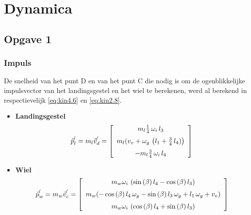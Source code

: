 \section{Dynamica}
\subsection{Opgave 1}
\subsubsection{Impuls}
De snelheid van het punt D en van het punt C die nodig is om de ogenblikkelijke impulsvector van het landingsgestel en het wiel te berekenen, werd al berekend in respectievelijk \eqref{eq:kin4.6} en \eqref{eq:kin2.8}.
\begin{itemize}
\item \textbf{Landingsgestel} 
\begin{equation}
\vec{p}_{l}^{'}=m_{l}\vec{v}_{d}^{'}=
\left[ \begin {array}{c} m_{l}\frac{1}{4}\,\omega_{i}\,l_{3}\\ \noalign{\medskip}m_{l}(v_{v}+\omega_{g}\, \left( l_{1}+\frac{3}{4}\,l_{4}) \right) \\ \noalign{\medskip}-m_{l}\frac{3}{4}\,\omega_{i}\,l_{4}\end {array} \right]
\label{eq:dyn1.1}
\end{equation}
\item \textbf{Wiel}
\begin{equation}
\vec{p}_{w}^{'}=m_{w}\vec{v}_{c}^{'}=
\left[ \begin {array}{c} m_{w}\omega_{i}\, \left( \sin \left( \beta
 \right) l_{4}-\cos \left( \beta \right) l_{3} \right) \\ \noalign{\medskip}m_{w}(-\cos \left( \beta \right) l_{4}\,\omega_{g}-\sin \left( \beta \right) l_{3}\,\omega_{g}+l_{1}\,\omega_{g}+v_{v})\\\noalign{\medskip}m_{w}\omega_{i}\, \left( \cos \left( \beta \right) l_{4}+\sin \left( \beta \right) l_{3} \right) \end {array} \right]
\label{eq:dyn1.2}
\end{equation}
\end{itemize}
